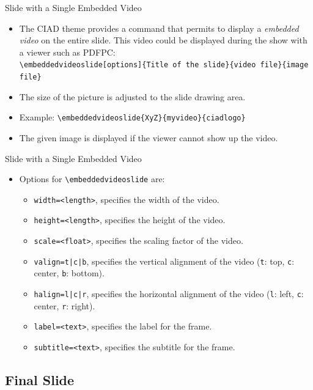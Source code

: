 \documentclass[english,sectioncirclenumberstyle]{ciadbeamer}
\begin{document}
\begin{frame}{Slide with a Single Embedded Video}
	\begin{itemize}
	\item The CIAD theme provides a command that permits to display a \emph{embedded video} on the entire slide. This video could be displayed during the show with a viewer such as PDFPC: \\
		\texttt{{\textbackslash}embeddedvideoslide[options]\{Title of the slide\}\{video file\}\{image file\}}
	\item The size of the picture is adjusted to the slide drawing area.
	\item Example: \texttt{{\textbackslash}embeddedvideoslide\{XyZ\}\{myvideo\}\{ciadlogo\}} 
	\item The given image is displayed if the viewer cannot show up the video.
	\end{itemize}
\end{frame}

\begin{frame}{Slide with a Single Embedded Video \insertcontinuationtext}
	\begin{itemize}
	\item Options for \texttt{{\textbackslash}embeddedvideoslide} are:
		\begin{itemize}
		\item \texttt{width=<length>}, specifies the width of the video.
		\vfill
		\item \texttt{height=<length>}, specifies the height of the video.
		\vfill
		\item \texttt{scale=<float>}, specifies the scaling factor of the video.
		\vfill
		\item \texttt{valign=t|c|b}, specifies the vertical alignment of the video (\texttt{t}: top, \texttt{c}: center, \texttt{b}: bottom).
		\vfill
		\item \texttt{halign=l|c|r}, specifies the horizontal alignment of the video (\texttt{l}: left, \texttt{c}: center, \texttt{r}: right).
		\vfill
		\item \texttt{label=<text>}, specifies the label for the frame.
		\vfill
		\item \texttt{subtitle=<text>}, specifies the subtitle for the frame.
		\end{itemize}
	\end{itemize}
\end{frame}

\subsection{Final Slide}
\end{document}
